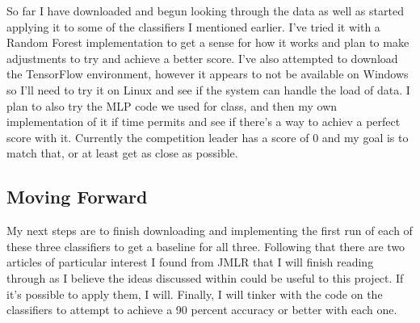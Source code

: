 \documentclass[12pt]{article}
\begin{document}
So far I have downloaded and begun looking through the data as well as started applying it to some of the classifiers I mentioned earlier. I've tried it with a Random Forest implementation to get a sense for how it works and plan to make adjustments to try and achieve a better score. I've also attempted to download the TensorFlow environment, however it appears to not be available on Windows so I'll need to try it on Linux and see if the system can handle the load of data. I plan to also try the MLP code we used for class, and then my own implementation of it if time permits and see if there's a way to achiev a perfect score with it. Currently the competition leader has a score of 0 and my goal is to match that, or at least get as close as possible.

\subsection{Moving Forward}

My next steps are to finish downloading and implementing the first run of each of these three classifiers to get a baseline for all three. Following that there are two articles of particular interest I found from JMLR that I will finish reading through as I believe the ideas discussed within could be useful to this project. If it's possible to apply them, I will. Finally, I will tinker with the code on the classifiers to attempt to achieve a 90 percent accuracy or better with each one.
\end{document}
